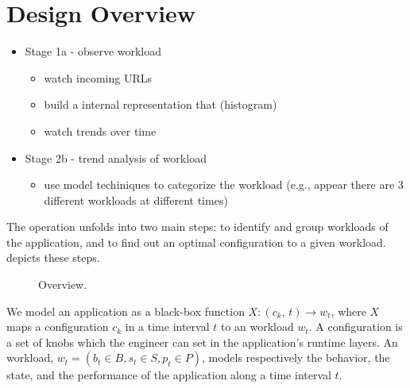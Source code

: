 \section{Design Overview}




 \begin{itemize}
   \item Stage 1a - observe workload
     \begin{itemize}
       \item watch incoming URLs
       \item build a internal representation that (histogram)
       \item watch trends over time
     \end{itemize}
   \item Stage 2b - trend analysis of workload
     \begin{itemize}
       \item use model techiniques to categorize the workload (e.g., appear there are 3 different workloads at different
         times)
     \end{itemize}
 \end{itemize}



The \name operation unfolds into two main steps: to identify and group workloads of the application, and to find out an
optimal configuration to a given workload.  depicts these steps.

\begin{figure*}[htp]
    \centering
    \def\svgwidth{\textwidth}
    \scalebox{1.0}{}
    \caption{\name Overview.}
    \label{fig:design-overview}
\end{figure*}

We model an application as a black-box function $X: (c_k,\, t) \rightarrow w_t$, where $X$ maps a configuration $c_k$
in a time interval $t$ to an workload $w_t$.  A configuration is a set of knobs which the engineer can set in the
application's runtime layers. An workload, $w_{t} = (b_t \in B, s_t \in S, p_t \in P)$, models respectively the
behavior, the state, and the performance of the application along a time interval $t$.

